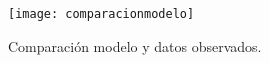 \begin{figure}[!hbt]
\centering
  \texttt{[image: comparacionmodelo]}
	\caption{Comparación modelo y datos observados.}%
	\label{fig:comparacionmodelo}
\end{figure}
